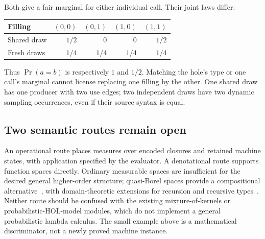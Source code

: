 \documentclass[11pt,a4paper]{article}
\begin{document}
Both give a fair marginal for either individual call. Their joint laws differ:

\begin{center}
\begin{tabular}{@{}lrrrr@{}}
\toprule
Filling & $(0,0)$ & $(0,1)$ & $(1,0)$ & $(1,1)$ \\
\midrule
Shared draw & $1/2$ & $0$ & $0$ & $1/2$ \\
Fresh draws & $1/4$ & $1/4$ & $1/4$ & $1/4$ \\
\bottomrule
\end{tabular}
\end{center}
Thus $\Pr(a=b)$ is respectively $1$ and $1/2$. Matching the hole's type or
one call's marginal cannot license replacing one filling by the other.
One shared draw has one producer with two use edges; two independent draws
have two dynamic sampling occurrences, even if their source syntax is equal.

\begin{center}
\end{center}

\subsection*{Two semantic routes remain open}
An operational route places measures over encoded closures and retained
machine states, with application specified by the evaluator. A denotational
route supports function spaces directly. Ordinary measurable spaces are
insufficient for the desired general higher-order structure; quasi-Borel
spaces provide a compositional alternative~\cite{QBS}, with domain-theoretic
extensions for recursion and recursive types~\cite{ProbDomains}.
Neither route should be confused with the existing mixture-of-kernels or
probabilistic-HOL-model modules, which do not implement a general probabilistic
lambda calculus. The small example above is a mathematical discriminator,
not a newly proved machine instance.
\end{document}
